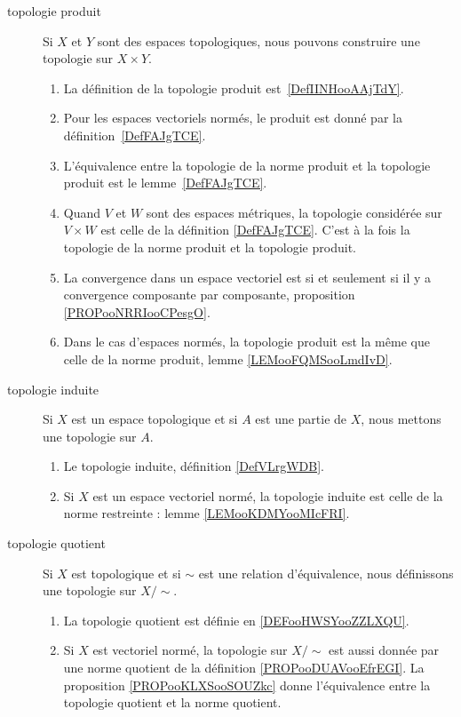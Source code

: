 
       \label{THEMEooYRIWooDXZnhX}
\begin{description}
    \item[topologie produit] 
        Si \( X\) et \( Y\) sont des espaces topologiques, nous pouvons construire une topologie sur \( X\times Y\).
\begin{enumerate}
	\item
	      La définition de la topologie produit est~\ref{DefIINHooAAjTdY}.
	\item
	      Pour les espaces vectoriels normés, le produit est donné par la définition~\ref{DefFAJgTCE}.
	\item
	      L'équivalence entre la topologie de la norme produit et la topologie produit est le lemme~\ref{DefFAJgTCE}.
	\item
	      Quand \( V\) et \( W\) sont des espaces métriques, la topologie considérée sur \( V\times W\) est celle de la définition \ref{DefFAJgTCE}. C'est à la fois la topologie de la norme produit et la topologie produit.
	\item
	      La convergence dans un espace vectoriel est si et seulement si il y a convergence composante par composante, proposition \ref{PROPooNRRIooCPesgO}.
      \item Dans le cas d'espaces normés, la topologie produit est la même que celle de la norme produit, lemme \ref{LEMooFQMSooLmdIvD}.
\end{enumerate}
\item[topologie induite]
    Si \( X\) est un espace topologique et si \( A\) est une partie de \( X\), nous mettons une topologie sur \( A\).
    \begin{enumerate}
        \item Le topologie induite, définition \ref{DefVLrgWDB}.
        \item Si \( X\) est un espace vectoriel normé, la topologie induite est celle de la norme restreinte : lemme \ref{LEMooKDMYooMIcFRI}.
    \end{enumerate}
\item[topologie quotient]
    Si \( X\) est topologique et si \( \sim\) est une relation d'équivalence, nous définissons une topologie sur \( X/\sim\).
    \begin{enumerate}
        \item La topologie quotient est définie en \ref{DEFooHWSYooZZLXQU}.
        \item
            Si \( X\) est vectoriel normé, la topologie sur \( X/\sim\) est aussi donnée par une norme quotient de la définition \ref{PROPooDUAVooEfrEGI}. La proposition \ref{PROPooKLXSooSOUZkc} donne l'équivalence entre la topologie quotient et la norme quotient.
    \end{enumerate}
\end{description}

